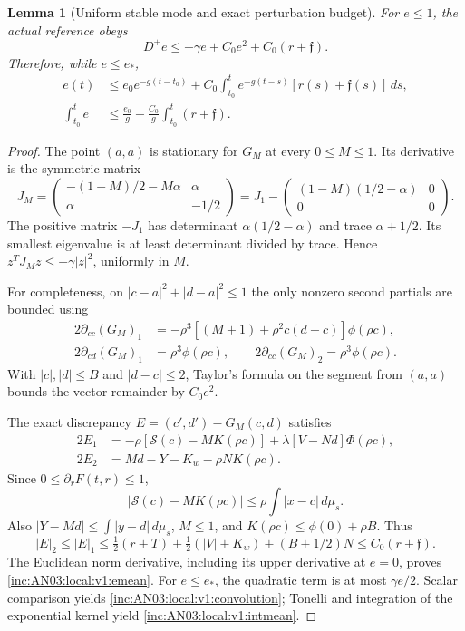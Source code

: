 \documentclass[11pt]{article}
\numberwithin{equation}{section}
\newtheorem{lemma}[theorem]{Lemma}
\theoremstyle{remark}\newtheorem{remark}[theorem]{Remark}
\newcommand{\dd}{\,d}\newcommand{\E}{\mathbb E}
\begin{document}
\begin{lemma}[Uniform stable mode and exact perturbation budget]
\label{inc:AN03:local:v1:meanineq}
For $e\le1$, the actual reference obeys
\begin{equation}\label{inc:AN03:local:v1:emean}
 D^+e\le-\gamma e+C_0e^2+C_0(r+\mathfrak f).
\end{equation}
Therefore, while $e\le e_*$,
\begin{align}
 e(t)&\le e_0e^{-g(t-t_0)}+
 C_0\int_{t_0}^te^{-g(t-s)}[r(s)+\mathfrak f(s)]\dd s,
 \label{inc:AN03:local:v1:convolution}\\
 \int_{t_0}^te&\le\frac{e_0}{g}
       +\frac{C_0}{g}\int_{t_0}^t(r+\mathfrak f).
 \label{inc:AN03:local:v1:intmean}
\end{align}
\end{lemma}
\begin{proof}
The point $(a,a)$ is stationary for $G_M$ at every $0\le M\le1$.
Its derivative is the symmetric matrix
\[
 J_M=\begin{pmatrix}-(1-M)/2-M\alpha&\alpha\\
                     \alpha&-1/2\end{pmatrix}
 =J_1-\begin{pmatrix}(1-M)(1/2-\alpha)&0\\0&0\end{pmatrix}.
\]
The positive matrix $-J_1$ has determinant
$\alpha(1/2-\alpha)$ and trace $\alpha+1/2$. Its smallest eigenvalue
is at least determinant divided by trace. Hence
$z^TJ_Mz\le-\gamma|z|^2$, uniformly in $M$.

For completeness, on $|c-a|^2+|d-a|^2\le1$ the only nonzero second
partials are bounded using
\begin{align*}
 2\partial_{cc}(G_M)_1
 &=-\rho^3[(M+1)+\rho^2c(d-c)]\phi(\rho c),\\
 2\partial_{cd}(G_M)_1&=\rho^3\phi(\rho c),\qquad
 2\partial_{cc}(G_M)_2=\rho^3\phi(\rho c).
\end{align*}
With $|c|,|d|\le B$ and $|d-c|\le2$, Taylor's formula on the segment
from $(a,a)$ bounds the vector remainder by $C_0e^2$.

The exact discrepancy $E=(c',d')-G_M(c,d)$ satisfies
\begin{align*}
 2E_1&=-\rho[\mathcal S(c)-MK(\rho c)]
                       +\lambda[V-Nd]\Phi(\rho c),\\
 2E_2&=Md-Y-K_w-\rho N K(\rho c).
\end{align*}
Since $0\le\partial_rF(t,r)\le1$,
\[
 |\mathcal S(c)-MK(\rho c)|\le\rho\int|x-c|\dd\mu_s.
\]
Also $|Y-Md|\le\int|y-d|\dd\mu_s$, $M\le1$, and
$K(\rho c)\le\phi(0)+\rho B$. Thus
\[
 |E|_2\le |E|_1\le\tfrac12(r+T)+\tfrac12(|V|+K_w)
                    +(B+1/2)N\le C_0(r+\mathfrak f).
\]
The Euclidean norm derivative, including its upper derivative at $e=0$,
proves \eqref{inc:AN03:local:v1:emean}. For $e\le e_*$, the quadratic
term is at most $\gamma e/2$. Scalar comparison yields
\eqref{inc:AN03:local:v1:convolution}; Tonelli and integration of the
exponential kernel yield \eqref{inc:AN03:local:v1:intmean}.
\end{proof}
\end{document}
